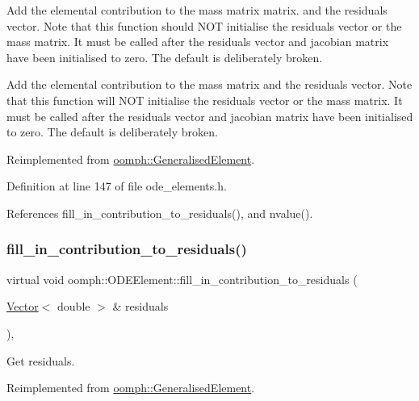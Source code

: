 Add the elemental contribution to the mass matrix matrix. and the residuals vector. Note that this function should N\+OT initialise the residuals vector or the mass matrix. It must be called after the residuals vector and jacobian matrix have been initialised to zero. The default is deliberately broken. 

Add the elemental contribution to the mass matrix and the residuals vector. Note that this function will N\+OT initialise the residuals vector or the mass matrix. It must be called after the residuals vector and jacobian matrix have been initialised to zero. The default is deliberately broken. 

Reimplemented from \hyperlink{classoomph_1_1GeneralisedElement_a09e337880e9bfc6e2d43202616121b50}{oomph\+::\+Generalised\+Element}.



Definition at line 147 of file ode\+\_\+elements.\+h.



References fill\+\_\+in\+\_\+contribution\+\_\+to\+\_\+residuals(), and nvalue().

\mbox{\label{classoomph_1_1ODEElement_ab13351a18eee7d2ba455312ea755801f}} 
\subsubsection{\texorpdfstring{fill\+\_\+in\+\_\+contribution\+\_\+to\+\_\+residuals()}{fill\_in\_contribution\_to\_residuals()}}
{\footnotesize\ttfamily virtual void oomph\+::\+O\+D\+E\+Element\+::fill\+\_\+in\+\_\+contribution\+\_\+to\+\_\+residuals (\begin{DoxyParamCaption}\item[{\hyperlink{classoomph_1_1Vector}{Vector}$<$ double $>$ \&}]{residuals }\end{DoxyParamCaption})\hspace{0.3cm}{\ttfamily [inline]}, {\ttfamily [virtual]}}



Get residuals. 



Reimplemented from \hyperlink{classoomph_1_1GeneralisedElement_a310c97f515e8504a48179c0e72c550d7}{oomph\+::\+Generalised\+Element}.




